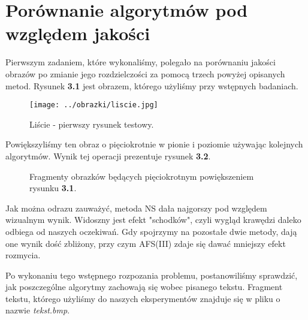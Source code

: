 \section{Porównanie algorytmów pod względem jakości}
Pierwszym zadaniem, które wykonaliśmy, polegało na porównaniu jakości obrazów po
zmianie jego rozdzielczości za pomocą trzech powyżej opisanych metod. Rysunek
\textbf{3.1} jest obrazem, którego użyliśmy przy wstępnych badaniach.
\begin{figure}[h!tb]
\begin{center}
\texttt{[image: ../obrazki/liscie.jpg]}
\caption{Liście - pierwszy rysunek testowy.}
\end{center}
\end{figure}

Powiększyliśmy ten obraz o pięciokrotnie w pionie i poziomie używając
kolejnych algorytmów. Wynik tej operacji prezentuje rysunek \textbf{3.2}.
\begin{figure}[h!tb]
\begin{center}
\caption{Fragmenty obrazków będących pięciokrotnym powiększeniem rysunku \textbf{3.1}.}
\end{center}
\end{figure}

Jak można odrazu zauważyć, metoda NS dała najgorszy pod względem wizualnym wynik.
Widoszny jest efekt "schodków", czyli wygląd krawędzi daleko odbiega od naszych
oczekiwań. Gdy spojrzymy na pozostałe dwie metody, dają one wynik dość zbliżony,
przy czym AFS(III) zdaje się dawać mniejszy efekt rozmycia.

Po wykonaniu tego wstępnego rozpozania problemu, postanowiliśmy sprawdzić, jak
poszczególne algorytmy zachowają się wobec pisanego tekstu.
Fragment tekstu, którego użyliśmy do naszych eksperymentów znajduje się w pliku
o nazwie \textit{tekst.bmp}.

